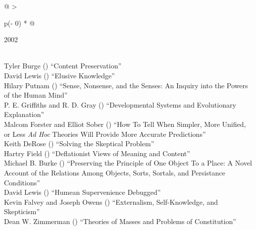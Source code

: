 \documentclass[
  10pt,
  letterpaper,
  DIV=11,
  numbers=noendperiod,
  twoside]{scrartcl}
\begin{document}
\begin{longtable}[]{@{}
  >{\raggedright\arraybackslash}p{(\columnwidth - 0\tabcolsep) * }@{}}

\caption{\label{tbl-top-ten-1993}Most cited articles published less than
ten years ago as of 2002.}

\tabularnewline

\toprule\noalign{}
\begin{minipage}[b]{\linewidth}\raggedright
2002
\end{minipage} \\
\midrule\noalign{}
\endhead
\bottomrule\noalign{}
\endlastfoot
Tyler Burge
()
``Content Preservation'' \\
David Lewis
()
``Elusive Knowledge'' \\
Hilary Putnam
()
``Sense, Nonsense, and the Senses: An Inquiry into the Powers of the
Human Mind'' \\
P. E. Griffiths and R. D. Gray
()
``Developmental Systems and Evolutionary Explanation'' \\
Malcom Forster and Elliot Sober
()
``How To Tell When Simpler, More Unified, or Less \emph{Ad Hoc} Theories
Will Provide More Accurate Predictions'' \\
Keith DeRose
()
``Solving the Skeptical Problem'' \\
Hartry Field
()
``Deflationist Views of Meaning and Content'' \\
Michael B. Burke
()
``Preserving the Principle of One Object To a Place: A Novel Account of
the Relations Among Objects, Sorts, Sortals, and Persistance
Conditions'' \\
David Lewis
()
``Humean Supervenience Debugged'' \\
Kevin Falvey and Joseph Owens
()
``Externalism, Self-Knowledge, and Skepticism'' \\
Dean W. Zimmerman
()
``Theories of Masses and Problems of Constitution'' \\

\end{longtable}
\end{document}
